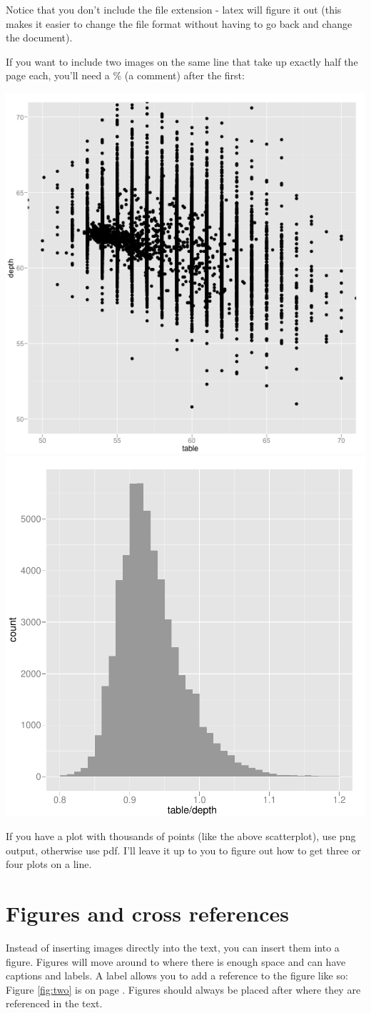 \documentclass[oneside]{article}
\begin{document}
Notice that you don't include the file extension - latex will figure it out (this makes it easier to change the file format without having to go back and change the document).

If you want to include two images on the same line that take up exactly half the page each, you'll need a \% (a comment) after the first:

\includegraphics[width = 0.5\linewidth]{table-depth}%
\includegraphics[width = 0.5\linewidth]{table-depth-ratio}

If you have a plot with thousands of points (like the above scatterplot), use png output, otherwise use pdf. I'll leave it up to you to figure out how to get three or four plots on a line.

\section{Figures and cross references}

Instead of inserting images directly into the text, you can insert them into a figure.  Figures will move around to where there is enough space and can have captions and labels.  A label allows you to add a reference to the figure like so:  Figure \ref{fig:two} is on page \pageref{fig:two}.  Figures should always be placed after where they are referenced in the text.
\end{document}
